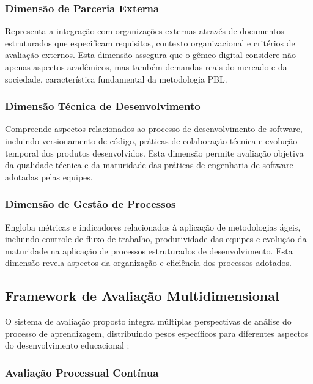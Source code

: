 \documentclass[12pt, a4paper, oneside]{abntex2}
\begin{document}
\subsubsection{Dimensão de Parceria Externa}

Representa a integração com organizações externas através de documentos estruturados que especificam requisitos, contexto organizacional e critérios de avaliação externos. Esta dimensão assegura que o gêmeo digital considere não apenas aspectos acadêmicos, mas também demandas reais do mercado e da sociedade, característica fundamental da metodologia PBL.

\subsubsection{Dimensão Técnica de Desenvolvimento}

Compreende aspectos relacionados ao processo de desenvolvimento de software, incluindo versionamento de código, práticas de colaboração técnica e evolução temporal dos produtos desenvolvidos. Esta dimensão permite avaliação objetiva da qualidade técnica e da maturidade das práticas de engenharia de software adotadas pelas equipes.

\subsubsection{Dimensão de Gestão de Processos}

Engloba métricas e indicadores relacionados à aplicação de metodologias ágeis, incluindo controle de fluxo de trabalho, produtividade das equipes e evolução da maturidade na aplicação de processos estruturados de desenvolvimento. Esta dimensão revela aspectos da organização e eficiência dos processos adotados.

\subsection{Framework de Avaliação Multidimensional}

O sistema de avaliação proposto integra múltiplas perspectivas de análise do processo de aprendizagem, distribuindo pesos específicos para diferentes aspectos do desenvolvimento educacional \cite{inteli2024}:

\subsubsection{Avaliação Processual Contínua}
\end{document}
